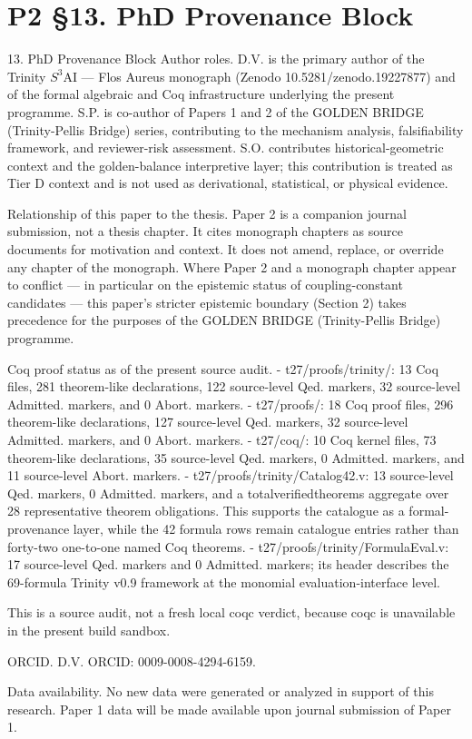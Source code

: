 
\section{P2 §13. PhD Provenance Block}

13. PhD Provenance Block
  Author roles. D.V. is the primary author of the Trinity $S^{3}$AI --- Flos Aureus monograph
  (Zenodo 10.5281/zenodo.19227877) and of the formal algebraic and Coq infrastructure
  underlying the present programme. S.P. is co-author of Papers 1 and 2 of the
  GOLDEN BRIDGE (Trinity-Pellis Bridge) series, contributing to the mechanism analysis, falsifiability framework,
  and reviewer-risk assessment. S.O. contributes historical-geometric context and the
  golden-balance interpretive layer; this contribution is treated as Tier D context and is
  not used as derivational, statistical, or physical evidence.

  Relationship of this paper to the thesis. Paper 2 is a companion journal submission, not
  a thesis chapter. It cites monograph chapters as source documents for motivation and
  context. It does not amend, replace, or override any chapter of the monograph. Where
  Paper 2 and a monograph chapter appear to conflict --- in particular on the epistemic
  status of coupling-constant candidates --- this paper's stricter epistemic boundary
  (Section 2) takes precedence for the purposes of the GOLDEN BRIDGE (Trinity-Pellis Bridge) programme.

  Coq proof status as of the present source audit.
  - t27/proofs/trinity/: 13 Coq files, 281 theorem-like declarations, 122 source-level Qed.
  markers, 32 source-level Admitted. markers, and 0 Abort. markers.
  - t27/proofs/: 18 Coq proof files, 296 theorem-like declarations, 127 source-level Qed.
  markers, 32 source-level Admitted. markers, and 0 Abort. markers.
  - t27/coq/: 10 Coq kernel files, 73 theorem-like declarations, 35 source-level Qed.
  markers, 0 Admitted. markers, and 11 source-level Abort. markers.
  - t27/proofs/trinity/Catalog42.v: 13 source-level Qed. markers, 0 Admitted. markers,
  and a totalverifiedtheorems aggregate over 28 representative theorem obligations. This
  supports the catalogue as a formal-provenance layer, while the 42 formula rows remain
  catalogue entries rather than forty-two one-to-one named Coq theorems.
  - t27/proofs/trinity/FormulaEval.v: 17 source-level Qed. markers and 0 Admitted.
  markers; its header describes the 69-formula Trinity v0.9 framework at the monomial
  evaluation-interface level.

  This is a source audit, not a fresh local coqc verdict, because coqc is unavailable in the
  present build sandbox.

  ORCID. D.V. ORCID: 0009-0008-4294-6159.

  Data availability. No new data were generated or analyzed in support of this research.
  Paper 1 data will be made available upon journal submission of Paper 1.